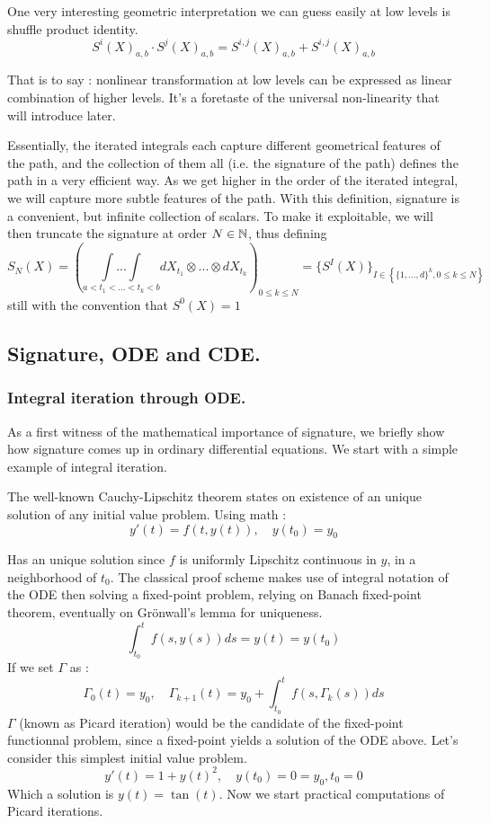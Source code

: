 \documentclass[10pt,a4paper]{article}
\begin{document}
One very interesting geometric interpretation we can guess easily at low levels is shuffle product identity.
$$ S^{i}(X)_{a, b} \cdot S^{j}(X)_{a, b} = S^{i,j}(X)_{a, b} + S^{i,j}(X)_{a, b}$$

That is to say : nonlinear transformation at low levels can be expressed as linear combination of higher levels. It's a foretaste of the universal non-linearity that will introduce later.

Essentially, the iterated integrals each capture different geometrical features of the path, and the collection of them all (i.e. the signature of the path) defines the path in a very efficient way. As we get higher in the order of the iterated integral, we will capture more subtle features of the path. With this definition, signature is a convenient, but infinite collection of scalars. To make it exploitable, we will then truncate the signature at order $N \in \mathbb{N}$, thus defining 
$$S_N(X) = \left( \underset{a<t_1<...<t_k<b}{\int ... \int } dX_{t_1} \otimes ... \otimes dX_{t_k}\right)_{0 \leq k \leq N} = \{S^I(X)\}_{I \in \left\{ \{1, ..., d \}^k, 0 \leq k \leq N \right\}}$$ still with the convention that $S^0(X) = 1$



\newpage
\subsection{Signature, ODE and CDE.}
\subsubsection{Integral iteration through ODE.}
As a first witness of the mathematical importance of signature, we briefly show how signature comes up in ordinary differential equations. We start with a simple example of integral iteration.

The well-known Cauchy-Lipschitz theorem states on existence of an unique solution of any initial value problem. Using math :
$$y'(t)= f(t, y(t)), \quad y(t_{0}) = y_{0}$$

Has an unique solution since $f$ is uniformly Lipschitz continuous in $y$, in a neighborhood of $t_0$. The classical proof scheme makes use of integral notation of the ODE then solving a fixed-point problem, relying on Banach fixed-point theorem, eventually on Grönwall's lemma for uniqueness.
$$ \int_{t_0}^{t} f(s, y(s)) ds = y(t) = y(t_0)$$
If we set $\Gamma$ as : $$\Gamma_{0}(t) = y_0, \quad\Gamma_{k+1}(t) = y_0 + \int_{t_0}^{t} f(s, \Gamma_{k}(s)) ds$$
$\Gamma$ (known as Picard iteration) would be the candidate of the fixed-point functionnal problem, since a fixed-point yields a solution of the ODE above.
Let's consider this simplest initial value problem.
$$y'(t) = 1 + y(t)^{2},  \quad y(t_{0}) = 0 = y_{0}, t_{0} = 0$$
Which a solution is $y(t) = \tan(t)$.
Now we start practical computations of Picard iterations.
\end{document}
